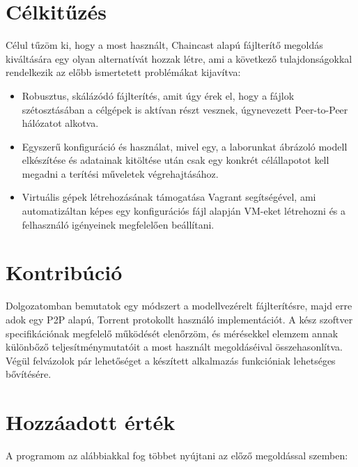 \section{Célkitűzés}

Célul tűzöm ki, hogy a most használt, Chaincast alapú fájlterítő megoldás kiváltására egy olyan alternatívát hozzak létre, ami a következő tulajdonságokkal rendelkezik az előbb ismertetett problémákat kijavítva:

\begin{itemize}
  \item Robusztus, skálázódó fájlterítés, amit úgy érek el, hogy a fájlok szétosztásában a célgépek is aktívan részt vesznek, úgynevezett Peer-to-Peer\cite{p2pdef} hálózatot alkotva.
  \item Egyszerű konfiguráció és használat, mivel egy, a laborunkat ábrázoló modell elkészítése és adatainak kitöltése után csak egy konkrét célállapotot kell megadni a terítési műveletek végrehajtásához.
  \item Virtuális gépek létrehozásának támogatása Vagrant\cite{vagrant} segítségével, ami automatizáltan képes egy konfigurációs fájl alapján VM-eket létrehozni és a felhasználó igényeinek megfelelően beállítani.
\end{itemize}

\section{Kontribúció}
Dolgozatomban bemutatok egy módszert a modellvezérelt fájlterítésre, majd erre adok egy P2P alapú, Torrent protokollt használó implementációt. A kész szoftver specifikációnak megfelelő működését elenőrzöm, és mérésekkel elemzem annak különbőző teljesítménymutatóit a most használt megoldáséival összehasonlítva. Végül felvázolok pár lehetőséget a készített alkalmazás funkcióniak lehetséges bővítésére.

\section{Hozzáadott érték}
A programom az alábbiakkal fog többet nyújtani az előző megoldással szemben:

